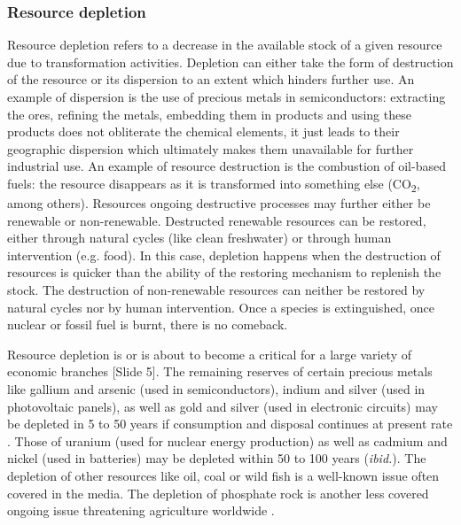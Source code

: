\documentclass{article}
\begin{document}
\subsubsection{Resource depletion}
\label{sec:depletion}
Resource depletion refers to a decrease in the available stock of a given resource due to transformation activities. Depletion can either take the form of destruction of the resource or its dispersion to an extent which hinders further use. An example of dispersion is the use of precious metals in semiconductors: extracting the ores, refining the metals, embedding them in products and using these products does not obliterate the chemical elements, it just leads to their geographic dispersion which ultimately makes them unavailable for further industrial use. An example of resource destruction is the combustion of oil-based fuels: the resource disappears as it is transformed into something else (CO\textsubscript{2}, among others). Resources ongoing destructive processes may further either be renewable or non-renewable. Destructed renewable resources can be restored, either through natural cycles (like clean freshwater) or through human intervention (e.g. food). In this case, depletion happens when the destruction of resources is quicker than the ability of the restoring mechanism to replenish the stock. The destruction of non-renewable resources can neither be restored by natural cycles nor by human intervention. Once a species is extinguished, once nuclear or fossil fuel is burnt, there is no comeback.

Resource depletion is or is about to become a critical for a large variety of economic branches {\color{blue}[Slide 5]}. The remaining reserves of certain precious metals like gallium and arsenic (used in semiconductors), indium and silver (used in photovoltaic panels), as well as gold and silver (used in electronic circuits) may be depleted in 5 to 50 years if consumption and disposal continues at present rate \cite{dodsonElementalSustainabilityTotal2012}. Those of uranium (used for nuclear energy production) as well as cadmium and nickel (used in batteries) may be depleted within 50 to 100 years (\emph{ibid.}). The depletion of other resources like oil, coal or wild fish is a well-known issue often covered in the media. The depletion of phosphate rock is another less covered ongoing issue threatening agriculture worldwide \cite{cooperFutureDistributionProduction2011}.
\end{document}
